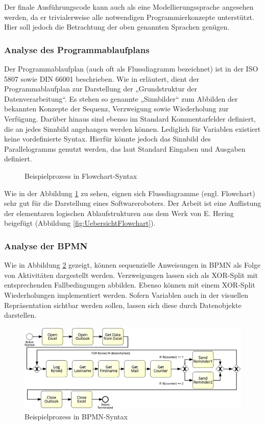 Der finale Ausführungscode kann auch als eine Modellierungssprache angesehen werden, da er trivialerweise alle notwendigen Programmierkonzepte unterstützt. Hier soll jedoch die Betrachtung der oben genannten Sprachen genügen.

\subsubsection{Analyse des Programmablaufplans}
Der Programmablaufplan (auch oft als Flussdiagramm bezeichnet) ist in der ISO 5807 sowie DIN 66001 beschrieben. Wie in \cite{Hering1984} erläutert, dient der Programmablaufplan zur Darstellung der „Grundstruktur der Datenverarbeitung“. Es stehen so genannte „Sinnbilder“ zum Abbilden der bekannten Konzepte der Sequenz, Verzweigung sowie Wiederholung zur Verfügung. Darüber hinaus sind ebenso im Standard Kommentarfelder definiert, die an jedes Sinnbild angehangen werden können. Lediglich für Variablen existiert keine vordefinierte Syntax. Hierfür könnte jedoch das Sinnbild des Parallelogramms genutzt werden, das laut Standard Eingaben und Ausgaben definiert. 

\begin{figure}[h!]
    \centering
    
    \caption{Beispielprozess in Flowchart-Syntax}
    \label{fig:ScrFlow}
\end{figure}

Wie in der Abbildung \ref{fig:ScrFlow} zu sehen, eignen sich Flussdiagramme (engl. Flowchart) sehr gut für die Darstellung eines Softwareroboters. Der Arbeit ist eine Auflistung der elementaren logischen Ablaufstrukturen aus dem Werk von E. Hering \cite{Hering1984} beigefügt (Abbildung \ref{fig:UebersichtFlowchart}).

\subsubsection{Analyse der BPMN}
Wie in Abbildung \ref{fig:ScrBPMN} gezeigt, können sequenzielle Anweisungen in BPMN als Folge von Aktivitäten dargestellt werden. Verzweigungen lassen sich als XOR-Split mit entsprechenden Fallbedingungen abbilden. Ebenso können mit einem XOR-Split  Wiederholungen implementiert werden. Sofern Variablen auch in der visuellen Repräsentation sichtbar werden sollen, lassen sich diese durch Datenobjekte darstellen. 

\begin{figure}[h!]
    \centering
    \includegraphics[width=1.0\textwidth]{Bachelorarbeit/images/ScreenshotBPMN4.png}
    \caption{Beispielprozess in BPMN-Syntax}
    \label{fig:ScrBPMN}
\end{figure}

